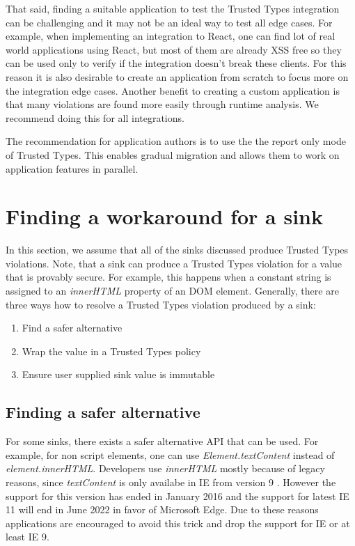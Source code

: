 That said, finding a suitable application to test the Trusted Types integration can be challenging
and it may not be an ideal way to test all edge cases. For example, when implementing an integration
to React, one can find lot of real world applications using React, but most of them are already XSS
free so they can be used only to verify if the integration doesn't break these clients. For this
reason it is also desirable to create an application from scratch to focus more on the integration
edge cases. Another benefit to creating a custom application is that many violations are found more
easily through runtime analysis. We recommend doing this for all integrations.

The recommendation for application authors is to use the the report only mode of Trusted Types. This
enables gradual migration and allows them to work on application features in parallel.

\section{Finding a workaround for a sink}

In this section, we assume that all of the sinks discussed produce Trusted Types violations. Note,
that a sink can produce a Trusted Types violation for a value that is provably secure. For example,
this happens when a constant string is assigned to an \emph{innerHTML} property of an DOM element.
Generally, there are three ways how to resolve a Trusted Types violation produced by a sink:

\begin{enumerate}
  \item Find a safer alternative
  \item Wrap the value in a Trusted Types policy
  \item Ensure user supplied sink value is immutable
\end{enumerate}

\subsection{Finding a safer alternative}

For some sinks, there exists a safer alternative API that can be used. For example, for non script
elements, one can use \emph{Element.textContent} instead of \emph{element.innerHTML}. Developers use
\emph{innerHTML} mostly because of legacy reasons, since \emph{textContent} is only availabe in IE
from version 9 \cite{text_content_mdn}. However the support for this version has ended in January
2016 and the support for latest IE 11 will end in June 2022 in favor of Microsoft Edge. Due to these
reasons applications are encouraged to avoid this trick and drop the support for IE or at least IE
9.

